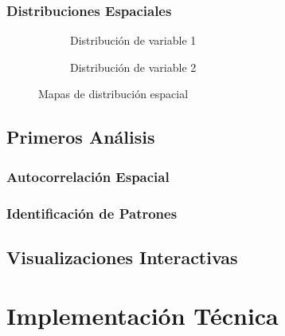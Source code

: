 \documentclass[11pt,letterpaper]{article}
\begin{document}
\subsubsection{Distribuciones Espaciales}

\begin{figure}[H]
    \centering
    \begin{subfigure}[b]{0.45\textwidth}
        \caption{Distribución de variable 1}
    \end{subfigure}
    \hfill
    \begin{subfigure}[b]{0.45\textwidth}
        \caption{Distribución de variable 2}
    \end{subfigure}
    \caption{Mapas de distribución espacial}
    \label{fig:distribucion}
\end{figure}

\subsection{Primeros Análisis}

\subsubsection{Autocorrelación Espacial}


\subsubsection{Identificación de Patrones}


\subsection{Visualizaciones Interactivas}



\section{Implementación Técnica}
\end{document}
